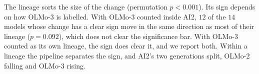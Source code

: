 The lineage sorts the size of the change (permutation $p<0.001$). Its sign depends on how OLMo-3 is labelled. With OLMo-3 counted inside AI2, $12$ of the $14$ models whose change has a clear sign move in the same direction as most of their lineage ($p=0.092$), which does not clear the significance bar. With OLMo-3 counted as its own lineage, the sign does clear it, and we report both. Within a lineage the pipeline separates the sign, and AI2's two generations split, OLMo-2 falling and OLMo-3 rising.

